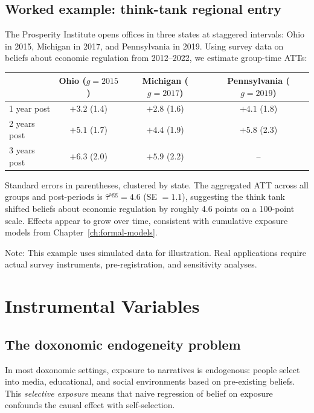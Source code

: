 \subsection{Worked example: think-tank regional entry}

\begin{example}
\label{ex:did-think-tank}
The Prosperity Institute opens offices in three states at staggered intervals: Ohio in 2015, Michigan in 2017, and Pennsylvania in 2019.
Using survey data on beliefs about economic regulation from 2012--2022, we estimate group-time ATTs:

\begin{center}
\begin{tabular}{lccc}
\toprule
& Ohio ($g = 2015$) & Michigan ($g = 2017$) & Pennsylvania ($g = 2019$) \\
\midrule
1 year post  & $+3.2$ (1.4) & $+2.8$ (1.6) & $+4.1$ (1.8) \\
2 years post & $+5.1$ (1.7) & $+4.4$ (1.9) & $+5.8$ (2.3) \\
3 years post & $+6.3$ (2.0) & $+5.9$ (2.2) & -- \\
\bottomrule
\end{tabular}
\end{center}
Standard errors in parentheses, clustered by state.
The aggregated ATT across all groups and post-periods is $\hat{\tau}^{\text{agg}} = 4.6$ (SE $= 1.1$), suggesting the think tank shifted beliefs about economic regulation by roughly 4.6 points on a 100-point scale.
Effects appear to grow over time, consistent with cumulative exposure models from Chapter~\ref{ch:formal-models}.

Note: This example uses simulated data for illustration.
Real applications require actual survey instruments, pre-registration, and sensitivity analyses.
\end{example}

\section{Instrumental Variables}
\label{sec:ch16-iv}

\subsection{The doxonomic endogeneity problem}

In most doxonomic settings, exposure to narratives is endogenous: people select into media, educational, and social environments based on pre-existing beliefs.
This \emph{selective exposure} means that naive regression of belief on exposure confounds the causal effect with self-selection.


